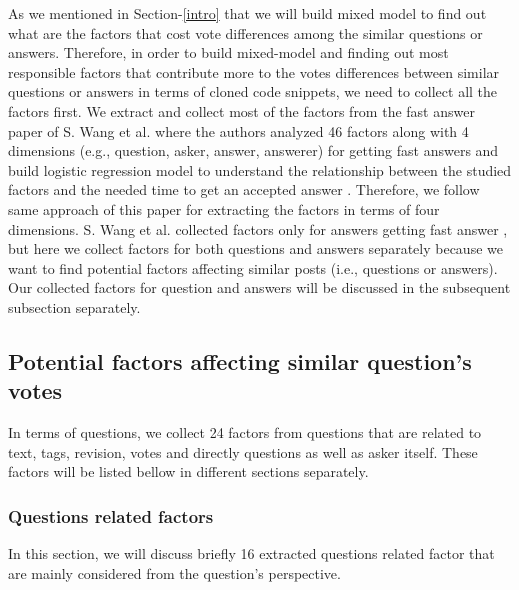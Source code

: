 \documentclass[conference]{IEEEtran}
\begin{document}
	As we mentioned in Section-\ref{intro} that we will build mixed model to find out what are the factors that cost vote differences among the similar questions or answers. Therefore, in order to build mixed-model and finding out most responsible factors that contribute more to the votes differences between similar questions or answers in terms of cloned code snippets, we need to collect all the factors first. We extract and collect most of the factors from the fast answer paper of S. Wang et al. \cite{b10} where the authors analyzed 46 factors along with 4 dimensions (e.g., question, asker, answer, answerer) for getting fast answers and build logistic regression model to understand the relationship between the studied factors and the needed time to get an accepted answer \cite{b10}. Therefore, we follow same approach of this paper for extracting the factors in terms of four dimensions. S. Wang et al. collected factors only for answers getting fast answer \cite{b10}, but here we collect factors for both questions and answers separately because we want to find potential factors affecting similar posts (i.e., questions or answers). Our collected factors  for question and answers will be discussed in the subsequent subsection separately. 
	
	\subsection{Potential factors affecting similar question's votes}
	In terms of questions, we collect 24 factors from questions that are related to text, tags, revision, votes and directly questions as well as asker itself. These factors will be listed bellow in different sections separately. 
	 
	\subsubsection{Questions related factors}\label{QF}
	In this section, we will discuss briefly 16 extracted questions related factor that are mainly considered from the question's perspective.
	
\end{document}

